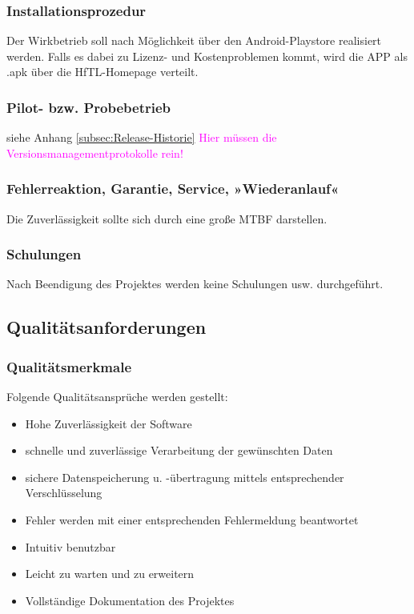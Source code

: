 \subsubsection{Installationsprozedur}

Der Wirkbetrieb soll nach Möglichkeit über den Android-Playstore realisiert werden. Falls es dabei zu Lizenz- und Kostenproblemen kommt, wird die APP als \ac{.apk} über die HfTL-Homepage verteilt.



\subsubsection{Pilot- bzw. Probebetrieb}

siehe Anhang \ref{subsec:Release-Historie}
\textcolor{magenta}{Hier müssen die Versionsmanagementprotokolle rein!}




\subsubsection{Fehlerreaktion, Garantie, Service, »Wiederanlauf«}
Die Zuverlässigkeit sollte sich durch eine große \ac{MTBF} darstellen.



\subsubsection{Schulungen}
Nach Beendigung des Projektes werden keine Schulungen usw. durchgeführt.


\subsection{\textbf{Qualitätsanforderungen}}

\subsubsection{Qualitätsmerkmale}
Folgende Qualitätsansprüche werden gestellt:
\begin{itemize}
	\item Hohe Zuverlässigkeit der Software
	\item schnelle und zuverlässige Verarbeitung der gewünschten Daten
	\item sichere Datenspeicherung u. -übertragung mittels entsprechender Verschlüsselung
	\item Fehler werden mit einer entsprechenden Fehlermeldung beantwortet
	\item Intuitiv benutzbar
	\item Leicht zu warten und zu erweitern
	\item Vollständige Dokumentation des Projektes
\end{itemize}




